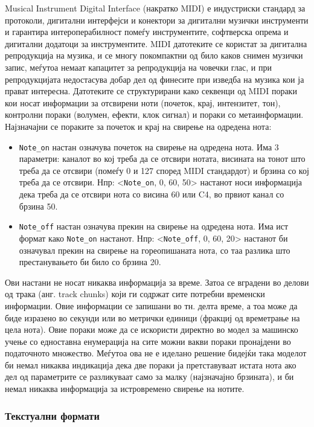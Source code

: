 Musical Instrument Digital Interface (накратко MIDI) е индустриски стандард за протоколи, дигитални интерфејси и конектори за дигитални музички инструменти и гарантира интероперабилност помеѓу инструментите, софтверска опрема и дигитални додатоци за инструментите. MIDI датотеките се користат за дигитална репродукција на музика, и се многу покомпактни од било каков снимен музички запис, меѓутоа немаат капацитет за репродукција на човечки глас, и при репродукцијата недостасува добар дел од финесите при изведба на музика кои ја прават интересна. 
Датотеките се структурирани како секвенци од MIDI пораки кои носат информации за отсвирени ноти (почеток, крај, интензитет, тон), контролни пораки (волумен, ефекти, клок сигнал) и пораки со метаинформации. Најзначајни се пораките за почеток и крај на свирење на одредена нота:
\begin{itemize}
    \item \texttt{Note\_on} настан означува почеток на свирење на одредена нота. Има 3 параметри: каналот во кој треба да се отсвири нотата, висината на тонот што треба да се отсвири (помеѓу 0 и 127 според MIDI стандардот) и брзина со кој треба да се отсвири. Нпр: <\texttt{Note\_on}, 0, 60, 50> настанот носи информација дека треба да се отсвири нота со висина 60 или C4, во првиот канал со брзина 50.
    \item \texttt{Note\_off} настан означува прекин на свирење на одредена нота. Има ист формат како \texttt{Note\_on} настанот. Нпр: <\texttt{Note\_off}, 0, 60, 20> настанот би означувал прекин на свирење на гореопишаната нота, со таа разлика што престанувањето би било со брзина 20.
\end{itemize}
Ови настани не носат никаква информација за време. Затоа се вградени во делови од трака (анг. track chunks) који ги содржат сите потребни временски информации. Овие информации се запишани во тн. делта време, а тоа може да биде изразено во секунди или во метрички единици (фракциј од времетрање на цела нота).
Овие пораки може да се искористи директно во модел за машинско учење со едноставна енумерација на сите можни вакви пораки пронајдени во податочното множество. Меѓутоа ова не е иделано решение бидејќи така моделот би немал никаква индикација дека две пораки ја претставуваат истата нота ако дел од параметрите се разликуваат само за малку (најзначајно брзината), и би немал никаква информација за истровремено свирење на нотите.

\subsubsection{Текстуални формати}

